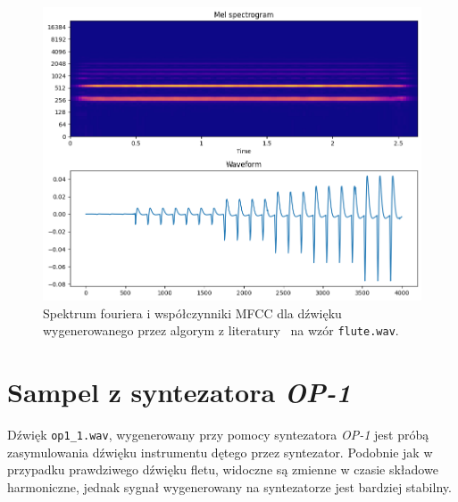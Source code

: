 \begin{multicols}{3}
\begin{figure}[H]
    \centering
    \includegraphics[width=0.9\linewidth]{rys06/macret_evolved_flute.png}
    \caption{
      Spektrum fouriera i współczynniki MFCC dla dźwięku
      wygenerowanego przez algorym z literatury~\cite{evolutionary_puredata}
      na wzór \texttt{flute.wav}.
    }\label{fig:evolved_literature_flute}
\end{figure}
\end{multicols}



\section{Sampel z syntezatora \textit{OP-1}}

Dźwięk \texttt{op1\_1.wav}, wygenerowany przy pomocy syntezatora \textit{OP-1} jest próbą
zasymulowania dźwięku instrumentu dętego przez syntezator. Podobnie jak w przypadku
prawdziwego dźwięku fletu, widoczne są zmienne w czasie składowe harmoniczne, jednak
sygnał wygenerowany na syntezatorze jest bardziej stabilny.

